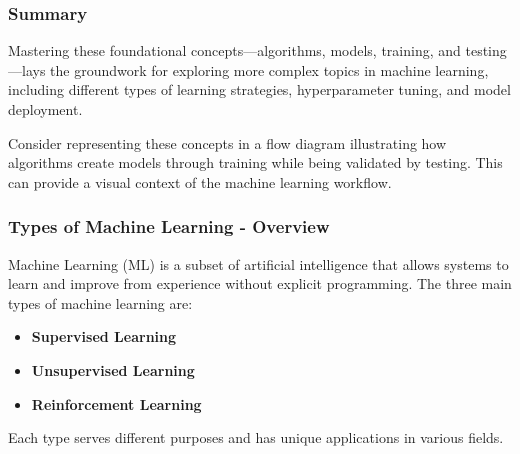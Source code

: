 \documentclass[aspectratio=169]{beamer}
\begin{document}
\begin{frame}[fragile]
    \frametitle{Summary}
    Mastering these foundational concepts—algorithms, models, training, and testing—lays the groundwork for exploring more complex topics in machine learning, including different types of learning strategies, hyperparameter tuning, and model deployment.
    
    Consider representing these concepts in a flow diagram illustrating how algorithms create models through training while being validated by testing. This can provide a visual context of the machine learning workflow.
\end{frame}

\begin{frame}[fragile]
    \frametitle{Types of Machine Learning - Overview}
    Machine Learning (ML) is a subset of artificial intelligence that allows systems to learn and improve from experience without explicit programming. The three main types of machine learning are:
    \begin{itemize}
        \item \textbf{Supervised Learning}
        \item \textbf{Unsupervised Learning}
        \item \textbf{Reinforcement Learning}
    \end{itemize}
    Each type serves different purposes and has unique applications in various fields.
\end{frame}
\end{document}
